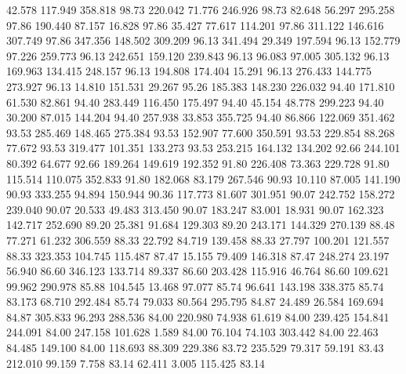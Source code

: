   42.578  117.949  358.818        98.73
 220.042   71.776  246.926        98.73
  82.648   56.297  295.258        97.86
 190.440   87.157   16.828        97.86
  35.427   77.617  114.201        97.86
 311.122  146.616  307.749        97.86
 347.356  148.502  309.209        96.13
 341.494   29.349  197.594        96.13
 152.779   97.226  259.773        96.13
 242.651  159.120  239.843        96.13
  96.083   97.005  305.132        96.13
 169.963  134.415  248.157        96.13
 194.808  174.404   15.291        96.13
 276.433  144.775  273.927        96.13
  14.810  151.531   29.267        95.26
 185.383  148.230  226.032        94.40
 171.810   61.530   82.861        94.40
 283.449  116.450  175.497        94.40
  45.154   48.778  299.223        94.40
  30.200   87.015  144.204        94.40
 257.938   33.853  355.725        94.40
  86.866  122.069  351.462        93.53
 285.469  148.465  275.384        93.53
 152.907   77.600  350.591        93.53
 229.854   88.268   77.672        93.53
 319.477  101.351  133.273        93.53
 253.215  164.132  134.202        92.66
 244.101   80.392   64.677        92.66
 189.264  149.619  192.352        91.80
 226.408   73.363  229.728        91.80
 115.514  110.075  352.833        91.80
 182.068   83.179  267.546        90.93
  10.110   87.005  141.190        90.93
 333.255   94.894  150.944        90.36
 117.773   81.607  301.951        90.07
 242.752  158.272  239.040        90.07
  20.533   49.483  313.450        90.07
 183.247   83.001   18.931        90.07
 162.323  142.717  252.690        89.20
  25.381   91.684  129.303        89.20
 243.171  144.329  270.139        88.48
  77.271   61.232  306.559        88.33
  22.792   84.719  139.458        88.33
  27.797  100.201  121.557        88.33
 323.353  104.745  115.487        87.47
  15.155   79.409  146.318        87.47
 248.274   23.197   56.940        86.60
 346.123  133.714   89.337        86.60
 203.428  115.916   46.764        86.60
 109.621   99.962  290.978        85.88
 104.545   13.468   97.077        85.74
  96.641  143.198  338.375        85.74
  83.173   68.710  292.484        85.74
  79.033   80.564  295.795        84.87
  24.489   26.584  169.694        84.87
 305.833   96.293  288.536        84.00
 220.980   74.938   61.619        84.00
 239.425  154.841  244.091        84.00
 247.158  101.628    1.589        84.00
  76.104   74.103  303.442        84.00
  22.463   84.485  149.100        84.00
 118.693   88.309  229.386        83.72
 235.529   79.317   59.191        83.43
 212.010   99.159    7.758        83.14
  62.411    3.005  115.425        83.14
